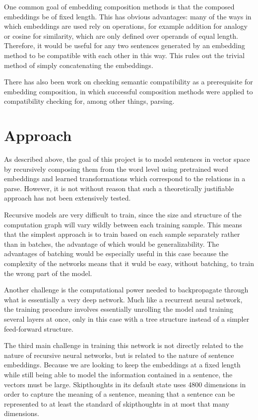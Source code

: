 \documentclass[11pt]{article}
\begin{document}
One common goal of embedding composition methods is that the composed embeddings be of fixed length. This has obvious advantages: many of the ways in which embeddings are used rely on operations, for example addition for analogy or cosine for similarity, which are only defined over operands of equal length. Therefore, it would be useful for any two sentences generated by an embedding method to be compatible with each other in this way. This rules out the trivial method of simply concatenating the embeddings.

There has also been work \cite{schoener2018} on checking semantic compatibility as a prerequisite for embedding composition, in which successful composition methods were applied to compatibility checking for, among other things, parsing.

\section{Approach}

As described above, the goal of this project is to model sentences in vector space by recursively composing them from the word level using pretrained word embeddings and learned transformations which correspond to the relations in a parse. However, it is not without reason that such a theoretically justifiable approach has not been extensively tested.

Recursive models are very difficult to train, since the size and structure of the computation graph will vary wildly between each training sample. This means that the simplest approach is to train based on each sample separately rather than in batches, the advantage of which would be generalizability. The advantages of batching would be especially useful in this case because the complexity of the networks means that it wuld be easy, without batching, to train the wrong part of the model.

Another challenge is the computational power needed to backpropagate through what is essentially a very deep network. Much like a recurrent neural network, the training procedure involves essentially unrolling the model and training several layers at once, only in this case with a tree structure instead of a simpler feed-forward structure.

The third main challenge in training this network is not directly related to the nature of recursive neural networks, but is related to the nature of sentence embeddings. Because we are looking to keep the embeddings at a fixed length while still being able to model the information contained in a sentence, the vectors must be large. Skipthoughts in its default state uses 4800 dimensions in order to capture the meaning of a sentence, meaning that a sentence can be represented to at least the standard of skipthoughts in at most that many dimensions.
\end{document}
